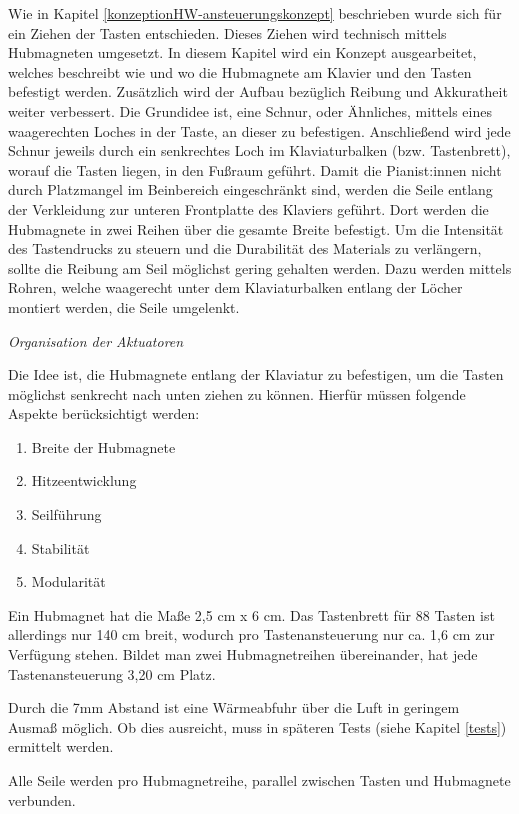 Wie in Kapitel \ref{konzeptionHW-ansteuerungskonzept} beschrieben wurde sich für ein Ziehen der Tasten entschieden.
Dieses Ziehen wird technisch mittels Hubmagneten umgesetzt.
In diesem Kapitel wird ein Konzept ausgearbeitet, welches beschreibt wie und wo die Hubmagnete am Klavier und den Tasten befestigt werden.
Zusätzlich wird der Aufbau bezüglich Reibung und Akkuratheit weiter verbessert.
\newline
Die Grundidee ist, eine Schnur, oder Ähnliches, mittels eines waagerechten Loches in der Taste, an dieser zu befestigen.
Anschließend wird jede Schnur jeweils durch ein senkrechtes Loch im Klaviaturbalken (bzw. Tastenbrett), worauf die Tasten liegen, in den Fußraum geführt.
Damit die Pianist:innen nicht durch Platzmangel im Beinbereich eingeschränkt sind,
werden die Seile entlang der Verkleidung zur unteren Frontplatte des Klaviers geführt.
Dort werden die Hubmagnete in zwei Reihen über die gesamte Breite befestigt.
Um die Intensität des Tastendrucks zu steuern und die Durabilität des Materials zu verlängern, sollte die Reibung am Seil möglichst gering gehalten werden.
Dazu werden mittels Rohren, welche waagerecht unter dem Klaviaturbalken entlang der Löcher montiert werden, die Seile umgelenkt.

\textit{Organisation der Aktuatoren}

Die Idee ist, die Hubmagnete entlang der Klaviatur zu befestigen, um die Tasten möglichst senkrecht nach unten ziehen zu können.
Hierfür müssen folgende Aspekte berücksichtigt werden:

\begin{enumerate}
	\item Breite der Hubmagnete
	\item Hitzeentwicklung
	\item Seilführung
	\item Stabilität
	\item Modularität
\end{enumerate}

Ein Hubmagnet hat die Maße 2,5 cm x 6 cm.
Das Tastenbrett für 88 Tasten ist allerdings nur 140 cm breit, wodurch pro Tastenansteuerung nur ca. 1,6 cm zur Verfügung stehen.
Bildet man zwei Hubmagnetreihen übereinander, hat jede Tastenansteuerung 3,20 cm Platz.

Durch die 7mm Abstand ist eine Wärmeabfuhr über die Luft in geringem Ausmaß möglich.
Ob dies ausreicht, muss in späteren Tests (siehe Kapitel \ref{tests}) ermittelt werden.

Alle Seile werden pro Hubmagnetreihe, parallel zwischen Tasten und Hubmagnete verbunden.

